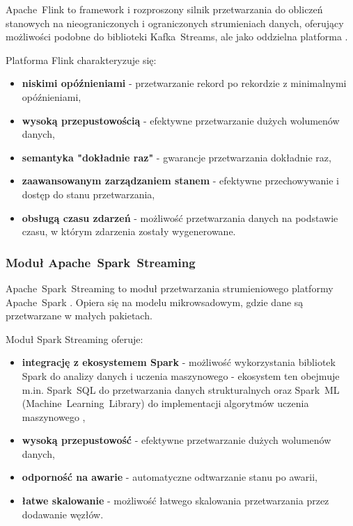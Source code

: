 \mbox{Apache Flink} to framework i rozproszony silnik przetwarzania do obliczeń stanowych na nieograniczonych i ograniczonych strumieniach danych, oferujący możliwości podobne do biblioteki \mbox{Kafka Streams},
ale jako oddzielna platforma \cite{flink}. 

\vspace{0.3em}

Platforma Flink charakteryzuje się:

\begin{itemize}
    \item \textbf{niskimi opóźnieniami} - przetwarzanie rekord po rekordzie z minimalnymi opóźnieniami,
    \item \textbf{wysoką przepustowością} - efektywne przetwarzanie dużych wolumenów danych,
    \item \textbf{semantyka "dokładnie raz"} - gwarancje przetwarzania dokładnie raz,
    \item \textbf{zaawansowanym zarządzaniem stanem} - efektywne przechowywanie i dostęp do stanu przetwarzania,
    \item \textbf{obsługą czasu zdarzeń} - możliwość przetwarzania danych na podstawie czasu, w którym zdarzenia zostały wygenerowane.
\end{itemize}

\subsubsection{Moduł \mbox{Apache Spark Streaming}}
\label{subsubsec:spark_streaming}

\mbox{Apache Spark Streaming} to moduł przetwarzania strumieniowego platformy \mbox{Apache Spark} \cite{spark_streaming}.
Opiera się na modelu mikrowsadowym, gdzie dane są przetwarzane w małych pakietach. 

\vspace{0.3em}

Moduł Spark Streaming oferuje:

\begin{itemize}
    \item \textbf{integrację z ekosystemem Spark} - możliwość wykorzystania bibliotek Spark do analizy danych i uczenia maszynowego - ekosystem ten obejmuje m.in. \mbox{Spark SQL} do przetwarzania danych strukturalnych \cite{chambers2018spark} oraz \mbox{Spark ML} (\mbox{Machine Learning Library}) do implementacji algorytmów uczenia maszynowego \cite{chambers2018spark},
    \item \textbf{wysoką przepustowość} - efektywne przetwarzanie dużych wolumenów danych,
    \item \textbf{odporność na awarie} - automatyczne odtwarzanie stanu po awarii,
    \item \textbf{łatwe skalowanie} - możliwość łatwego skalowania przetwarzania przez dodawanie węzłów.
\end{itemize}

